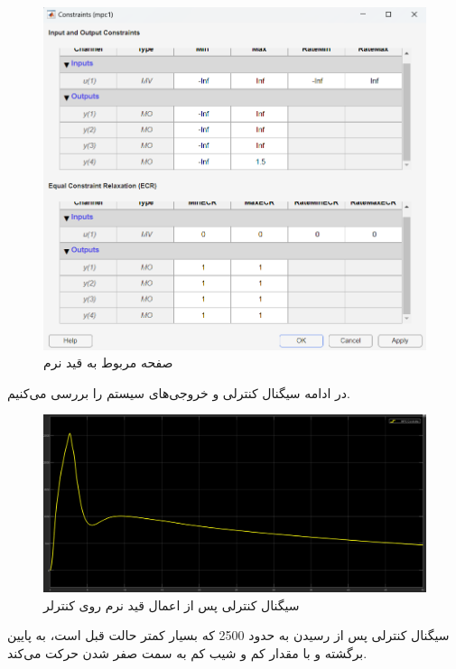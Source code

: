 \documentclass[14pt, a4paper]{extarticle}
\begin{document}
\begin{figure}[h!]
	\centering
	\includegraphics[scale = 0.5]{Q2_2_1_cons.png}
	\caption{صفحه مربوط به قید نرم 
		}
\end{figure}

در ادامه سیگنال کنترلی و خروجی‌های سیستم را بررسی می‌کنیم.

 \begin{figure}[h!]
	\centering
	\includegraphics[scale = 0.3]{Q2_2_1_control.png}
	\caption{سیگنال کنترلی پس از اعمال قید نرم روی کنترلر}
\end{figure}

سیگنال کنترلی پس از رسیدن به حدود 2500 که بسیار کمتر حالت قبل است، به پایین برگشته و با مقدار کم و شیب کم به سمت صفر شدن حرکت می‌کند. 
\end{document}
